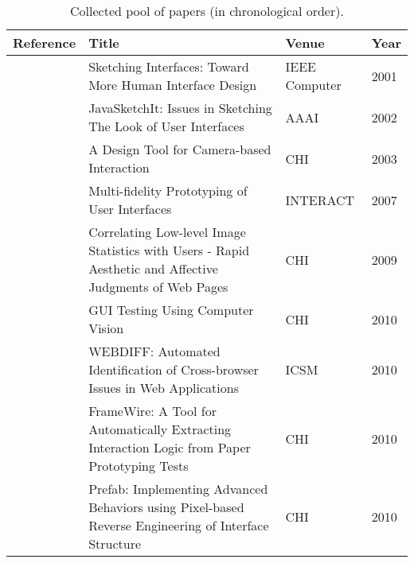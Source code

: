 \begin{sidewaystable}
\tiny
\renewcommand{\arraystretch}{1.0}
\setlength{\tabcolsep}{4.5pt}
\caption{Collected pool of papers (in chronological order).}
\label{table:selected-primary-studies}
\begin{tabular}{@{} lp{12.9cm}ll @{}}
\toprule
\textbf{Reference}           & \textbf{Title}                                                                                                                      & \textbf{Venue} & \textbf{Year} \\  

\midrule

\citet{Landay-2001-IEEEComputer}       & Sketching Interfaces: Toward More Human Interface Design                                                                  & IEEE Computer  & 2001          \\
\citet{Caetano-2002-AAAI}    & JavaSketchIt: Issues in Sketching The Look of User Interfaces                                                                       & AAAI           & 2002          \\
\citet{Fails-2003-CHI}       & A Design Tool for Camera-based Interaction                                                                                          & CHI            & 2003          \\

\citet{Coyette-2007-INTERACT}& Multi-fidelity Prototyping of User Interfaces                                                                                       & INTERACT       & 2007          \\

\citet{Zheng-2009-CHI}       & Correlating Low-level Image Statistics with Users - Rapid Aesthetic and Affective Judgments of Web Pages                            & CHI            & 2009          \\
\citet{Chang-2010-CHI}       & GUI Testing Using Computer Vision                                                                                                   & CHI            & 2010          \\
\citet{Choudhary-2010-ICSM}  & WEBDIFF: Automated Identification of Cross-browser Issues in Web Applications                                                       & ICSM           & 2010          \\
\citet{Li-2010-CHI}          & FrameWire: A Tool for Automatically Extracting Interaction Logic from Paper Prototyping Tests                                       & CHI            & 2010          \\
\citet{Dixon-2010-CHI}       & Prefab: Implementing Advanced Behaviors using Pixel-based Reverse Engineering of Interface Structure                                & CHI            & 2010          \\


\end{tabular}
\end{sidewaystable}
